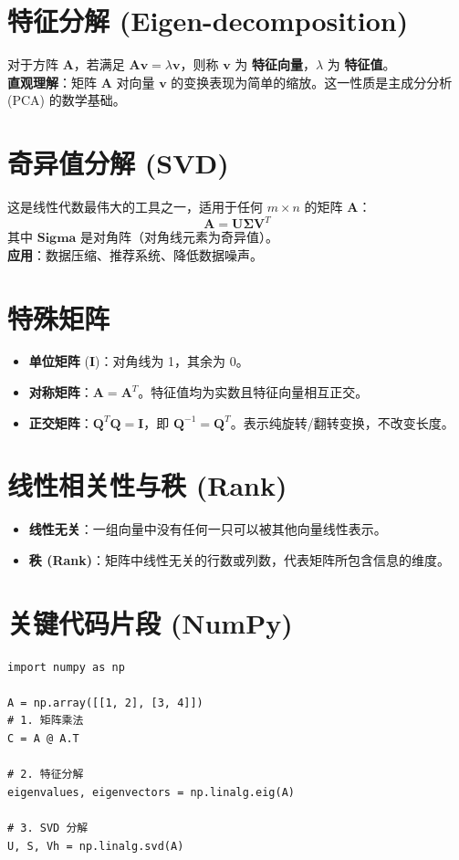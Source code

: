 \documentclass[12pt, a4paper]{article}
\begin{document}
\section{特征分解 (Eigen-decomposition)}
对于方阵 $\mathbf{A}$，若满足 $\mathbf{A}\mathbf{v} = \lambda \mathbf{v}$，则称 $\mathbf{v}$ 为 \textbf{特征向量}，$\lambda$ 为 \textbf{特征值}。
\\ \textbf{直观理解}：矩阵 $\mathbf{A}$ 对向量 $\mathbf{v}$ 的变换表现为简单的缩放。这一性质是主成分分析 (PCA) 的数学基础。

\section{奇异值分解 (SVD)}
这是线性代数最伟大的工具之一，适用于任何 $m \times n$ 的矩阵 $\mathbf{A}$：
$$ \mathbf{A} = \mathbf{U}\mathbf{\Sigma}\mathbf{V}^T $$
其中 $\mathbf{Sigma}$ 是对角阵（对角线元素为奇异值）。
\\ \textbf{应用}：数据压缩、推荐系统、降低数据噪声。

\section{特殊矩阵}
\begin{itemize}
    \item \textbf{单位矩阵} ($\mathbf{I}$)：对角线为 1，其余为 0。
    \item \textbf{对称矩阵}：$\mathbf{A} = \mathbf{A}^T$。特征值均为实数且特征向量相互正交。
    \item \textbf{正交矩阵}：$\mathbf{Q}^T\mathbf{Q} = \mathbf{I}$，即 $\mathbf{Q}^{-1} = \mathbf{Q}^T$。表示纯旋转/翻转变换，不改变长度。
\end{itemize}

\section{线性相关性与秩 (Rank)}
\begin{itemize}
    \item \textbf{线性无关}：一组向量中没有任何一只可以被其他向量线性表示。
    \item \textbf{秩 (Rank)}：矩阵中线性无关的行数或列数，代表矩阵所包含信息的维度。
\end{itemize}

\section{关键代码片段 (NumPy)}
\begin{lstlisting}
import numpy as np

A = np.array([[1, 2], [3, 4]])
# 1. 矩阵乘法
C = A @ A.T

# 2. 特征分解
eigenvalues, eigenvectors = np.linalg.eig(A)

# 3. SVD 分解
U, S, Vh = np.linalg.svd(A)
\end{lstlisting}
\end{document}
